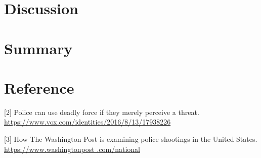 \documentclass[11pt,a4paper,english]{article}
\begin{document}
\section{Discussion}
\section{Summary}
\section{Reference}
[2] Police can use deadly force if they merely perceive a threat. \href{https://www.vox.com/identities/2016/8/13/17938226/police-shootings-killings-law-legal-standard-garner-graham-connor}{https://www.vox.com/identities/2016/8/13/17938226}

[3] How The Washington Post is examining police shootings in the United States. \href{https://www.washingtonpost .com/national/how-the-washington-post-is-examining-police-shootings-in-the-united-states/2016/07/07/d9c52238-43ad-11e6-8856-f26de2537a9d_story.html?utm_term=.bb540299ce96}{https://www.washingtonpost .com/national}
\end{document}
